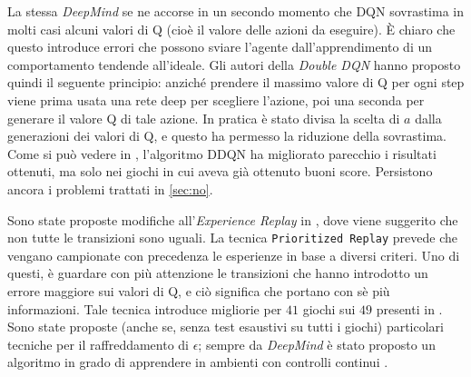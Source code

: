 \documentclass[twoside,twocolumn,10pt]{extarticle}
\theoremstyle{definition}
\begin{document}
	La stessa \textit{DeepMind} se ne accorse in un secondo momento che DQN sovrastima in molti casi alcuni valori di Q (cioè il valore delle azioni da eseguire). È chiaro che questo introduce errori che possono sviare l'agente dall'apprendimento di un comportamento tendende all'ideale. Gli autori della \textit{Double DQN} \cite{bib:ddqn} hanno proposto quindi il seguente principio: anziché prendere il massimo valore di Q per ogni step viene prima usata una rete deep per scegliere l'azione, poi una seconda per generare il valore Q di tale azione. In pratica è stato divisa la scelta di $a$ dalla generazioni dei valori di Q, e questo ha permesso la riduzione della sovrastima. Come si può vedere in \cite{bib:ddqn}, l'algoritmo DDQN ha migliorato parecchio i risultati ottenuti, ma solo nei giochi in cui aveva già ottenuto buoni score. Persistono ancora i problemi trattati in \ref{sec:no}. 
	
	Sono state proposte modifiche all'\textit{Experience Replay} in \cite{bib:per}, dove viene suggerito che non tutte le transizioni sono uguali. La tecnica \texttt{Prioritized Replay} prevede che vengano campionate con precedenza le esperienze in base a diversi criteri. Uno di questi, è guardare con più attenzione le transizioni che hanno introdotto un errore maggiore sui valori di Q, e ciò significa che portano con sè più informazioni. Tale tecnica introduce migliorie per $41$ giochi sui $49$ presenti in \cite{bib:dqn}. Sono state proposte (anche se, senza test esaustivi su tutti i giochi) particolari tecniche per il raffreddamento di $\epsilon$; sempre da \textit{DeepMind} è stato proposto un algoritmo in grado di apprendere in ambienti con controlli continui \cite{bib:con}.
\end{document}
